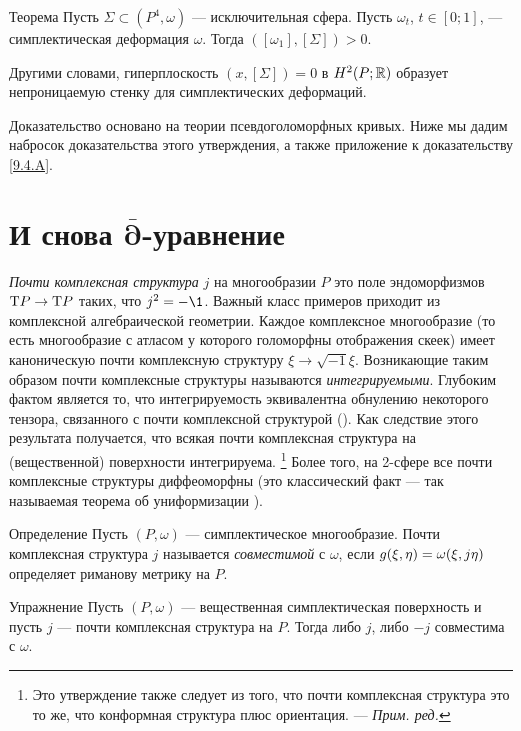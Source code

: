 \begin{thm}{Теорема}\label{10.1.A}
Пусть $\Sigma \subset (P^4, \omega)$ — исключительная сфера.
Пусть $\omega_t$, $t \in [0;1]$, — симплектическая деформация $\omega$.
Тогда $([\omega_1 ], [\Sigma]) > 0$.
\end{thm}

Другими словами, гиперплоскость $(x, [\Sigma]) = 0$ в $H^2 (P;\mathbb{R})$ образует непроницаемую стенку для симплектических деформаций.

Доказательство основано на теории псевдоголоморфных кривых.
Ниже мы дадим набросок доказательства этого утверждения, а также
приложение к доказательству \ref{9.4.A}. 

\section[\texorpdfstring{И снова $\bar\partial$-уравнение}{И снова ∂-уравнение}]{И снова $\bm{\bar\partial}$-уравнение}

\emph{Почти комплексная структура} $j$ на многообразии $P$ это поле
эндоморфизмов $\mathrm{T} P \to \mathrm{T} P$ таких, что $j^2 = -\1$. 
Важный класс примеров приходит из комплексной алгебраической геометрии.
Каждое комплексное многообразие (то есть многообразие с атласом у
которого голоморфны отображения скеек) имеет каноническую почти
комплексную структуру $\xi \to \sqrt{-1}\xi$. 
Возникающие таким образом почти комплексные структуры называются
\emph{интегрируемыми}. 
Глубоким фактом является то, что интегрируемость эквивалентна
обнулению некоторого тензора, связанного с почти комплексной
структурой (\cite{NN}). 
Как следствие этого результата получается, что всякая почти
комплексная структура на (вещественной) поверхности интегрируема.%
\footnote{Это утверждение также следует из того, что почти комплексная структура это то же, что конформная структура плюс ориентация. — \textit{Прим. ред.}}
Более того, на 2-сфере все почти комплексные структуры диффеоморфны (это классический факт — так называемая теорема об униформизации \cite{AS}).

\begin{ex*}{Определение}
Пусть $(P, \omega)$ — симплектическое многообразие.
Почти комплексная структура $j$ называется \emph{совместимой} с $\omega$, если $g(\xi,
\eta) \z= \omega(\xi, j\eta)$ определяет риманову метрику на $P$. 
\end{ex*}


\begin{ex}{Упражнение}\label{10.2.A}
Пусть $(P, \omega)$ — вещественная симплектическая
поверхность и пусть $j$ — почти комплексная структура на $P$. 
Тогда либо $j$, либо $-j$ совместима с $\omega$.
\end{ex}

